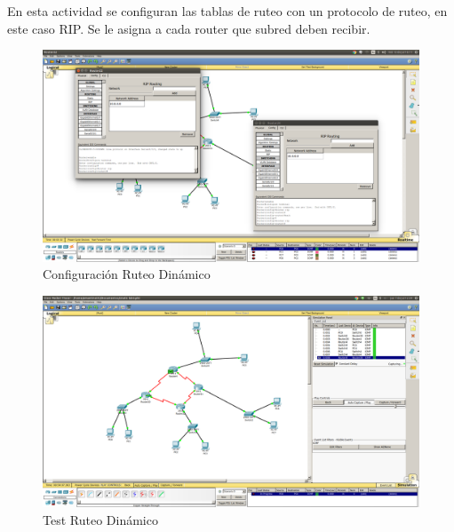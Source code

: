 \documentclass[spanish]{udpreport}
\begin{document}
En esta actividad se configuran las tablas de ruteo con un protocolo de ruteo, en este caso RIP. Se le asigna a cada router que subred deben recibir.
\begin{figure}[H]
	\centering
	\includegraphics[scale=.25]{imagenes/ruteo_dinamic.png}
	\caption{Configuración Ruteo Dinámico}
	\label{fig:Figura 4.1}
\end{figure}

\begin{figure}[H]
	\centering
	\includegraphics[scale=.25]{imagenes/test_rdinamic.png}
	\caption{Test Ruteo Dinámico}
	\label{fig:Figura 4.2}
\end{figure}
\end{document}
